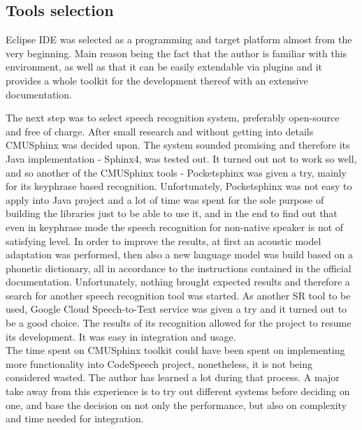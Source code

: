 \subsection{Tools selection}
Eclipse IDE was selected as a programming and target platform almost from the very beginning. Main reason being the fact that the author is familiar with this environment, as well as that it can be easily extendable via plugins and it provides a whole toolkit for the development thereof with an extensive documentation. 

The next step was to select speech recognition system, preferably open-source and free of charge. After small research and without getting into details CMUSphinx was decided upon. The system sounded promising and therefore its Java implementation - Sphinx4, was tested out. It turned out not to work so well, and so another of the CMUSphinx tools - Pocketsphinx was given a try, mainly for its keyphrase based recognition. Unfortunately, Pocketsphinx was not easy to apply into Java project and a lot of time was spent for the sole purpose of building the libraries just to be able to use it, and in the end to find out that even in keyphrase mode the speech recognition for non-native speaker is not of satisfying level. In order to improve the results, at first an acoustic model adaptation was performed, then also a new language model was build based on a phonetic dictionary, all in accordance to the instructions contained in the official documentation. Unfortunately, nothing brought expected results and therefore a search for another speech recognition tool was started. As another SR tool to be used, Google Cloud Speech-to-Text service was given a try and it turned out to be a good choice. The results of its recognition allowed for the project to resume its development. It was easy in integration and usage. \\
The time spent on CMUSphinx toolkit could have been spent on implementing more functionality into CodeSpeech project, nonetheless, it is not being considered wasted. The author has learned a lot during that process. A major take away from this experience is to try out different systems before deciding on one, and base the decision on not only the performance, but also on complexity and time needed for integration. 

